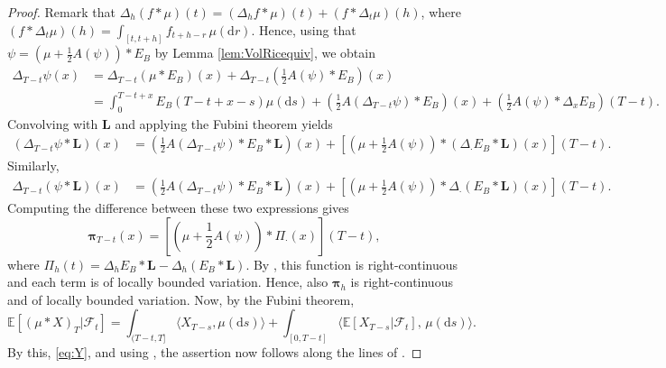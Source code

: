 \documentclass[10pt,a4paper,reqno]{amsart}
\theoremstyle{plain}
\theoremstyle{definition}
\theoremstyle{remark}
\theoremstyle{example}
\begin{document}
\begin{proof}
Remark that $\Delta_h(f\ast \mu)(t) = (\Delta_h f\ast \mu)(t) + (f\ast\Delta_t \mu)(h)$, where $(f \ast \Delta_t \mu)(h) = \int_{[t,t+h]} f_{t+h -r}\, \mu(\mathrm{d}r)$. Hence, using that $\psi = \left( \mu + \frac{1}{2}A(\psi)\right)\ast E_B$ by Lemma \ref{lem:VolRicequiv}, we obtain
     \begin{align*}
         \Delta_{T-t}\psi(x) &= \Delta_{T-t}(\mu\ast E_B)(x) + \Delta_{T-t}\left(\frac{1}{2}A(\psi)\ast E_B\right)(x) \\
         &= \int_0^{T-t+x}E_B(T-t+x-s)\mu(\mathrm{d} s)  + \left(\frac{1}{2}A(\Delta_{T-t}\psi)\ast E_B\right)(x) + \left(\frac{1}{2}A(\psi)\ast\Delta_xE_B\right)(T-t).
     \end{align*}
     Convolving with $\bm{L}$ and applying the Fubini theorem yields
     \begin{align*}
         (\Delta_{T-t}\psi\ast \bm{L})(x) &= \left(\frac{1}{2}A(\Delta_{T-t}\psi)\ast E_B\ast \bm{L}\right)(x) + \left[\left(\mu + \frac{1}{2}A(\psi)\right)\ast(\Delta_\cdot E_B\ast \bm{L})(x)\right](T-t).
     \end{align*}
     Similarly,
     \begin{align*}
         \Delta_{T-t}(\psi\ast \bm{L})(x) &= \left(\frac{1}{2}A(\Delta_{T-t}\psi)\ast E_B\ast \bm{L}\right)(x) + \left[\left(\mu + \frac{1}{2}A(\psi)\right)\ast\Delta_\cdot(E_B\ast \bm{L})(x)\right](T-t).
     \end{align*}
     Computing the difference between these two expressions gives
    \begin{equation*}
         \bm{\pi}_{T-t}(x) = \left[\left(\mu + \frac{1}{2}A(\psi)\right)\ast\Pi_\cdot(x)\right](T-t),
     \end{equation*}
     where $\Pi_h(t) = \Delta_h E_B \ast \bm{L} - \Delta_h (E_B \ast \bm{L})$. By \cite[Thm. 4.5(i)]{abi2019affine}, this function is right-continuous and each term is of locally bounded variation. Hence, also $\bm{\pi}_h$ is right-continuous and of locally bounded variation. Now, by the Fubini theorem,
     \begin{equation*}
         \mathbb{E}[(\mu\ast X)_T|\mathcal{F}_t] = \int_{(T-t,T]} \langle X_{T-s}, \mu(\mathrm{d} s)\rangle + \int_{[0,T-t]} \langle \mathbb{E}[X_{T-s}|\mathcal{F}_t],\, \mu(\mathrm{d} s) \rangle.
     \end{equation*}
     By this, \eqref{eq:Y}, and using \cite[Thm. 4.5(i) and eq. (4.16)]{abi2019affine}, the assertion now follows along the lines of \cite[Thm. 4.5.(ii)]{abi2019affine}. 
\end{proof}    
\end{document}
